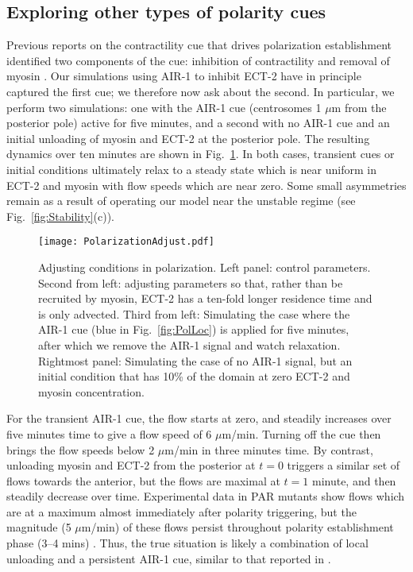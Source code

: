 \documentclass[11pt]{article}
\begin{document}
\subsection{Exploring other types of polarity cues}
Previous reports on the contractility cue that drives polarization establishment identified two components of the cue: inhibition of contractility and removal of myosin \citep{gross2019guiding}. Our simulations using AIR-1 to inhibit ECT-2 have in principle captured the first cue; we therefore now ask about the second. In particular, we perform two simulations: one with the AIR-1 cue (centrosomes 1 $\mu$m from the posterior pole) active for five minutes, and a second with no AIR-1 cue and an initial unloading of myosin and ECT-2 at the posterior pole. The resulting dynamics over ten minutes are shown in Fig.\ \ref{fig:CueVsIC}. In both cases, transient cues or initial conditions ultimately relax to a steady state which is near uniform in ECT-2 and myosin with flow speeds which are near zero. Some small asymmetries remain as a result of operating our model near the unstable regime (see Fig.\ \ref{fig:Stability}(c)). 


\begin{figure}
\centering
\texttt{[image: PolarizationAdjust.pdf]}
\caption{\label{fig:CueVsIC}Adjusting conditions in polarization. Left panel: control parameters. Second from left: adjusting parameters so that, rather than be recruited by myosin, ECT-2 has a ten-fold longer residence time and is only advected. Third from left: Simulating the case where the AIR-1 cue (blue in Fig.\ \ref{fig:PolLoc}) is applied for five minutes, after which we remove the AIR-1 signal and watch relaxation. Rightmost panel: Simulating the case of no AIR-1 signal, but an initial condition that has 10\% of the domain at zero ECT-2 and myosin concentration.}
\end{figure}

For the transient AIR-1 cue, the flow starts at zero, and steadily increases over five minutes time to give a flow speed of 6 $\mu$m/min. Turning off the cue then brings the flow speeds below 2 $\mu$m/min in three minutes time. By contrast, unloading myosin and ECT-2 from the posterior at $t=0$ triggers a similar set of flows towards the anterior, but the flows are maximal at $t=1$ minute, and then steadily decrease over time. Experimental data in PAR mutants show flows which are at a maximum almost immediately after polarity triggering, but the magnitude (5 $\mu$m/min) of these flows persist throughout polarity establishment phase (3--4 mins) \citep[Fig.~2G]{gross2019guiding}. Thus, the true situation is likely a combination of local unloading and a persistent AIR-1 cue, similar to that reported in \citep{gross2019guiding}. 
\end{document}
